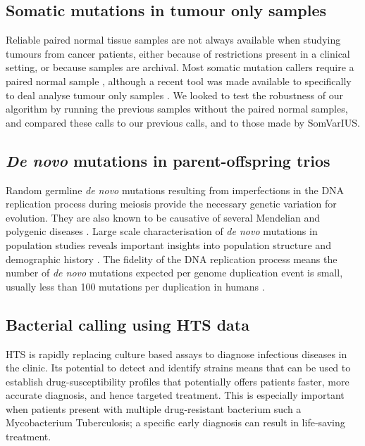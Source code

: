 \documentclass[notitlepage, twocolumn]{article}
\begin{document}
\subsection*{Somatic mutations in tumour only samples}

Reliable paired normal tissue samples are not always available when studying tumours from cancer patients, either because of restrictions present in a clinical setting, or because samples are archival. Most somatic mutation callers require a paired normal sample \cite{mutect, somaticsniper, radia, strelka, varscan2}, although a recent tool was made available to specifically to deal analyse tumour only samples \cite{somvarius}. We looked to test the robustness of our algorithm by running the previous samples without the paired normal samples, and compared these calls to our previous calls, and to those made by SomVarIUS.

\subsection*{\emph{De novo} mutations in parent-offspring trios}

Random germline \emph{de novo} mutations resulting from imperfections in the DNA replication process during meiosis provide the necessary genetic variation for evolution. They are also known to be causative of several Mendelian and polygenic diseases \cite{denovos-disease, schizophrenia-denovo, id-denovo}. Large scale characterisation of \emph{de novo} mutations in population studies reveals important insights into population structure and demographic history \cite{denovo-pop}. The fidelity of the DNA replication process means the number of \emph{de novo} mutations expected per genome duplication event is small, usually less than 100 mutations per duplication in humans \cite{denovo-rate}.

\subsection*{Bacterial calling using HTS data}

HTS is rapidly replacing culture based assays to diagnose infectious diseases in the clinic. Its potential to detect and identify strains means that can be used to establish drug-susceptibility profiles that potentially offers patients faster, more accurate diagnosis, and hence targeted treatment. This is especially important when patients present with multiple drug-resistant bacterium such a Mycobacterium Tuberculosis; a specific early diagnosis can result in life-saving treatment.
\end{document}
